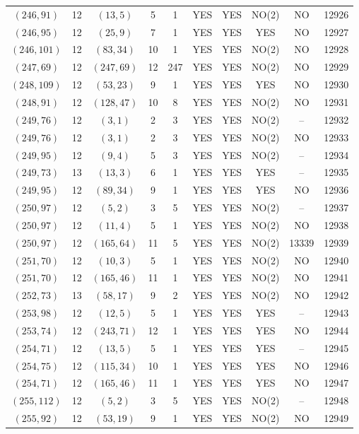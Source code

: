 \begin{longtable}{|c|c|c|c|c|c|c|c|c|c|}
$(246, 91)$ & 12 & $(13, 5)$ & 5 & 1 & YES & YES & NO(2) & NO & 12926\\
$(246, 95)$ & 12 & $(25, 9)$ & 7 & 1 & YES & YES & YES & NO & 12927\\
$(246, 101)$ & 12 & $(83, 34)$ & 10 & 1 & YES & YES & NO(2) & NO & 12928\\
$(247, 69)$ & 12 & $(247, 69)$ & 12 & 247 & YES & YES & NO(2) & NO & 12929\\
$(248, 109)$ & 12 & $(53, 23)$ & 9 & 1 & YES & YES & YES & NO & 12930\\
$(248, 91)$ & 12 & $(128, 47)$ & 10 & 8 & YES & YES & NO(2) & NO & 12931\\
$(249, 76)$ & 12 & $(3, 1)$ & 2 & 3 & YES & YES & NO(2) & -- & 12932\\
$(249, 76)$ & 12 & $(3, 1)$ & 2 & 3 & YES & YES & NO(2) & NO & 12933\\
$(249, 95)$ & 12 & $(9, 4)$ & 5 & 3 & YES & YES & NO(2) & -- & 12934\\
$(249, 73)$ & 13 & $(13, 3)$ & 6 & 1 & YES & YES & YES & -- & 12935\\
$(249, 95)$ & 12 & $(89, 34)$ & 9 & 1 & YES & YES & YES & NO & 12936\\
$(250, 97)$ & 12 & $(5, 2)$ & 3 & 5 & YES & YES & NO(2) & -- & 12937\\
$(250, 97)$ & 12 & $(11, 4)$ & 5 & 1 & YES & YES & NO(2) & NO & 12938\\
$(250, 97)$ & 12 & $(165, 64)$ & 11 & 5 & YES & YES & NO(2) & 13339 & 12939\\
$(251, 70)$ & 12 & $(10, 3)$ & 5 & 1 & YES & YES & NO(2) & NO & 12940\\
$(251, 70)$ & 12 & $(165, 46)$ & 11 & 1 & YES & YES & NO(2) & NO & 12941\\
$(252, 73)$ & 13 & $(58, 17)$ & 9 & 2 & YES & YES & NO(2) & NO & 12942\\
$(253, 98)$ & 12 & $(12, 5)$ & 5 & 1 & YES & YES & YES & -- & 12943\\
$(253, 74)$ & 12 & $(243, 71)$ & 12 & 1 & YES & YES & YES & NO & 12944\\
$(254, 71)$ & 12 & $(13, 5)$ & 5 & 1 & YES & YES & YES & -- & 12945\\
$(254, 75)$ & 12 & $(115, 34)$ & 10 & 1 & YES & YES & YES & NO & 12946\\
$(254, 71)$ & 12 & $(165, 46)$ & 11 & 1 & YES & YES & YES & NO & 12947\\
$(255, 112)$ & 12 & $(5, 2)$ & 3 & 5 & YES & YES & NO(2) & -- & 12948\\
$(255, 92)$ & 12 & $(53, 19)$ & 9 & 1 & YES & YES & NO(2) & NO & 12949\\

\end{longtable}
